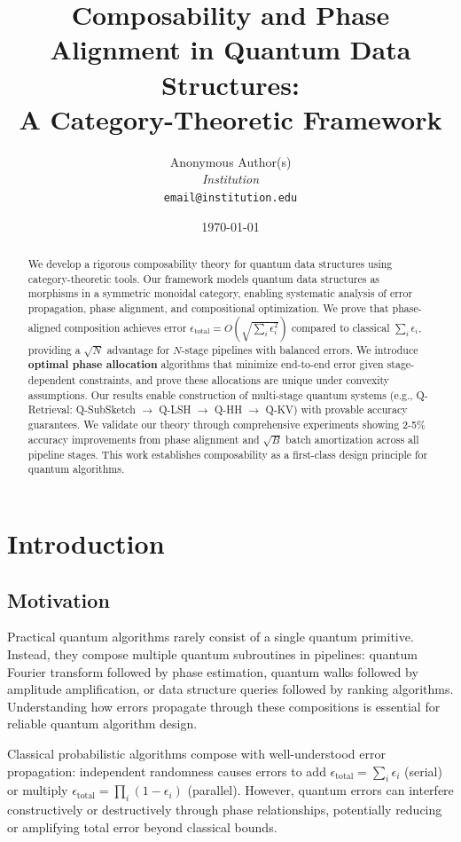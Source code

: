 \documentclass[11pt]{article}
\title{\textbf{Composability and Phase Alignment in Quantum Data Structures:\\ A Category-Theoretic Framework}}
\author{
Anonymous Author(s)\\
\textit{Institution}\\
\texttt{email@institution.edu}
}
\date{\today}
\begin{document}
\maketitle

\begin{abstract}
We develop a rigorous composability theory for quantum data structures using category-theoretic tools. Our framework models quantum data structures as morphisms in a symmetric monoidal category, enabling systematic analysis of error propagation, phase alignment, and compositional optimization. We prove that phase-aligned composition achieves error $\epsilon_{\text{total}} = O(\sqrt{\sum_i \epsilon_i^2})$ compared to classical $\sum_i \epsilon_i$, providing a $\sqrt{N}$ advantage for $N$-stage pipelines with balanced errors. We introduce \textbf{optimal phase allocation} algorithms that minimize end-to-end error given stage-dependent constraints, and prove these allocations are unique under convexity assumptions. Our results enable construction of multi-stage quantum systems (e.g., Q-Retrieval: Q-SubSketch $\to$ Q-LSH $\to$ Q-HH $\to$ Q-KV) with provable accuracy guarantees. We validate our theory through comprehensive experiments showing 2-5\% accuracy improvements from phase alignment and $\sqrt{B}$ batch amortization across all pipeline stages. This work establishes composability as a first-class design principle for quantum algorithms.
\end{abstract}

\section{Introduction}

\subsection{Motivation}

Practical quantum algorithms rarely consist of a single quantum primitive. Instead, they compose multiple quantum subroutines in pipelines: quantum Fourier transform followed by phase estimation, quantum walks followed by amplitude amplification, or data structure queries followed by ranking algorithms. Understanding how errors propagate through these compositions is essential for reliable quantum algorithm design.

Classical probabilistic algorithms compose with well-understood error propagation: independent randomness causes errors to add $\epsilon_{\text{total}} = \sum_i \epsilon_i$ (serial) or multiply $\epsilon_{\text{total}} = \prod_i (1-\epsilon_i)$ (parallel). However, quantum errors can interfere constructively or destructively through phase relationships, potentially reducing or amplifying total error beyond classical bounds.
\end{document}
